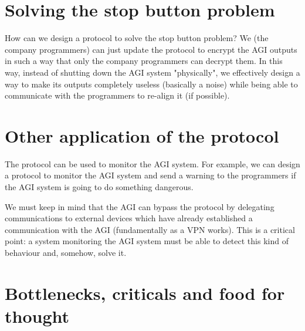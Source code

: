 \documentclass{article}
\begin{document}
\section{Solving the stop button problem }
How can we design a protocol to solve the stop button problem?
We (the company programmers) can just update the protocol to encrypt the AGI outputs in such a way that only the company programmers can decrypt them.
In this way, instead of shutting down the AGI system "physically", we effectively design a way to make its outputs completely useless (basically a noise) 
while being able to communicate with the programmers to re-align it (if possible).

\section{Other application of the protocol}
The protocol can be used to monitor the AGI system.
For example, we can design a protocol to monitor the AGI system and send a warning to the programmers if the AGI system is going to do something dangerous.

We must keep in mind that the AGI can bypass the protocol by delegating communications to external devices which have already established a communication with the AGI (fundamentally as a VPN works).
This is a critical point: a system monitoring the AGI system must be able to detect this kind of behaviour and, somehow, solve it.

\section{Bottlenecks, criticals and food for thought}
\end{document}
